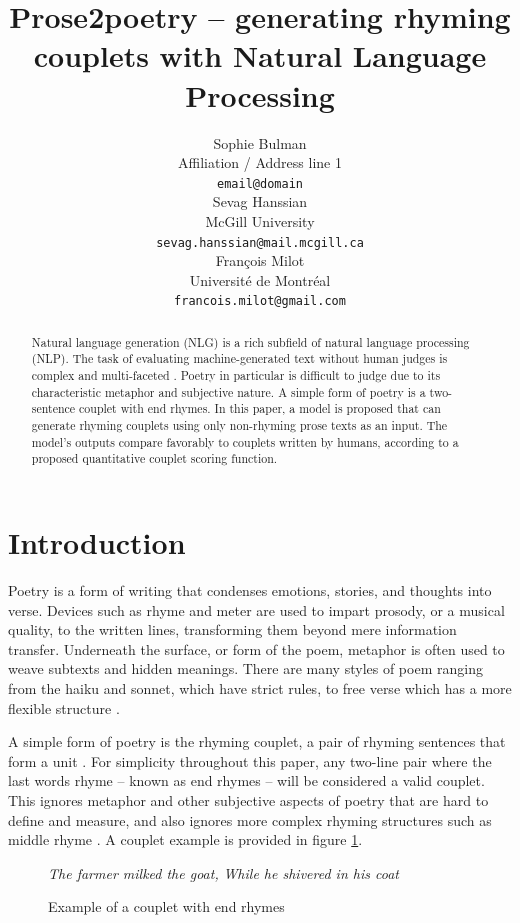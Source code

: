 \documentclass[11pt,a4paper]{article}
\title{Prose2poetry -- generating rhyming couplets with Natural Language Processing}
\author{Sophie Bulman \\
  Affiliation / Address line 1 \\
  \texttt{email@domain} \\\And
  Sevag Hanssian \\
  McGill University \\
  \texttt{sevag.hanssian@mail.mcgill.ca} \\\AND
  François Milot \\
  Université de Montréal \\
  \texttt{francois.milot@gmail.com} \\}
\date{}
\begin{document}
\maketitle
\begin{abstract}
	Natural language generation (NLG) is a rich subfield of natural language processing (NLP). The task of evaluating machine-generated text without human judges is complex and multi-faceted \cite{nlgeval}. Poetry in particular is difficult to judge due to its characteristic metaphor and subjective nature. A simple form of poetry is a two-sentence couplet with end rhymes. In this paper, a model is proposed that can generate rhyming couplets using only non-rhyming prose texts as an input. The model's outputs compare favorably to couplets written by humans, according to a proposed quantitative couplet scoring function.
\end{abstract}

\section{Introduction}
\label{sec:intro}

Poetry is a form of writing that condenses emotions, stories, and thoughts into verse. Devices such as rhyme and meter are used to impart prosody, or a musical quality, to the written lines, transforming them beyond mere information transfer. Underneath the surface, or form of the poem, metaphor is often used to weave subtexts and hidden meanings. There are many styles of poem ranging from the haiku and sonnet, which have strict rules, to free verse which has a more flexible structure \citep{poem_type}.

A simple form of poetry is the rhyming couplet, a pair of rhyming sentences that form a unit \cite{couplet_def}. For simplicity throughout this paper, any two-line pair where the last words rhyme -- known as end rhymes \cite{end_rhyme_def} -- will be considered a valid couplet. This ignores metaphor and other subjective aspects of poetry that are hard to define and measure, and also ignores more complex rhyming structures such as middle rhyme \cite{internal_rhyme_def}. A couplet example is provided in figure \ref{fig:couplet_example}.

\begin{figure}
	\textit{The farmer milked the goat,} \newline
	\textit{While he shivered in his coat}
\caption{Example of a couplet with end rhymes}
\label{fig:couplet_example}
\end{figure}
\end{document}
